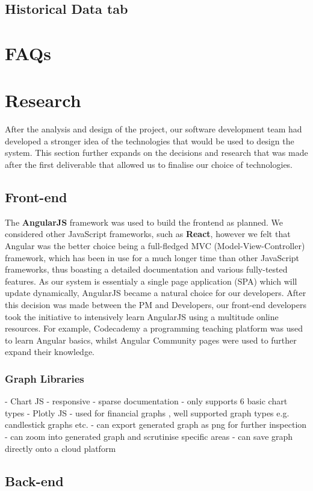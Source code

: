 \documentclass[12pt]{article}
\begin{document}
  \subsection{Historical Data tab}
\section{FAQs}
\section{Research}
  After the analysis and design of the project, our software development team had developed a stronger idea
  of the technologies that would be used to design the system. This section further expands on the decisions and
  research that was made after the first deliverable that allowed us to finalise our choice of technologies.
  \subsection{Front-end}
  The \textbf{AngularJS} framework was used to build the frontend as planned. We considered other JavaScript frameworks,
  such as \textbf{React}, however we felt that Angular was the better choice being a full-fledged MVC (Model-View-Controller) framework,
  which has been in use for a much longer time than other JavaScript frameworks, thus boasting a detailed documentation and various fully-tested features.
  As our system is essentialy a single page application (SPA) which will update dynamically, AngularJS became a natural choice for our developers.
  \newline
  After this decision was made between the PM and Developers, our front-end developers took the initiative to intensively learn AngularJS using a multitude online resources.
  For example, Codecademy a programming teaching platform was used to learn Angular basics, whilst Angular Community pages were used to further expand their knowledge.
  \subsubsection{Graph Libraries}
  - Chart JS
    - responsive
    - sparse documentation
    - only supports 6 basic chart types
  - Plotly JS
    - used for financial graphs , well supported graph types e.g. candlestick graphs etc.
    - can export generated graph as png for further inspection
    - can zoom into generated graph and scrutinise specific areas
    - can save graph directly onto a cloud platform
  \subsection{Back-end}
\end{document}
